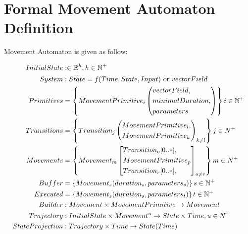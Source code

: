 \newpage
\section{Formal Movement Automaton Definition}\label{s:MovementAutomatonDefinitionAndProperties}

    \begin{definition}\label{def:movementAutomaton}Movement Automaton is given as follow:
    
    \begin{align}   
        \label{eq:madInitialState}
        InitialState&: \in \mathbb{R}^h, h\in \mathbb{N}^+\\
        \label{eq:madSystemdefinition}
        System&: \dot{State}=f(Time,State,Input)\text{ or } vectorField\\
        \label{eq:madMovementPrimitive}
        Primitives &= \left\{MovementPrimitive_i\left(
                                \begin{aligned}
                                &vectorField,\\
                                &minimalDuration,\\
                                &parameters
                                \end{aligned}\right)
                            \right\} i \in \mathbb{N}^+\\
        \label{eq:madTransitions}
        Transitions&= \left\{Transition_j\left(
                                \begin{aligned}
                                    &MovementPrimitive_l,\\
                                    &MovementPrimitive_k
                                \end{aligned}\right)_{k\neq l}\right\} j\in N^+\\
        \label{eq:madMovements}
        Movements&= \left\{Movement_m\left[
                                \begin{aligned}
                                    &Transition_o[0..*],\\
                                    &MovementPrimitive_p\\
                                    &Transition_r[0..*],\\
                                \end{aligned}\right]_{o \neq r}\right\}  m\in N^+\\
        \label{eq:madBuffer}
        Buffer&= \left\{Movement_s(duration_s,parameters_s)\right\} s\in \mathbb{N}^+\\
        \label{eq:madExecuted}
        Executed&= \left\{Movement_s(duration_s,parameters_t)\right\} t\in \mathbb{N}^+\\
        \label{eq:madBuilder}
        Builder&:Movement \times MovementPrimitive \to Movement\\
        \label{eq:madTrajectory}
        Trajectory&:InitialState\times Movement^u \to State \times Time, u\in N^+\\
        \label{eq:madStateProjection}
        StateProjection&:Trajectory\times Time \to State(Time)  
    \end{align}
    

\end{definition}
